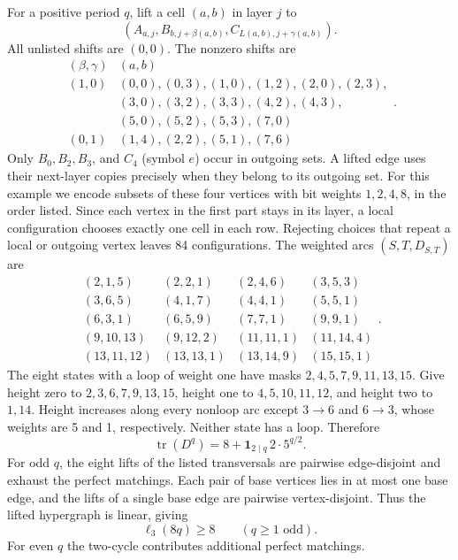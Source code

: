 \documentclass[10pt]{article}
\numberwithin{equation}{section}
\begin{document}
For a positive period $q$, lift a cell $(a,b)$ in layer $j$ to
\[
 (A_{a,j},B_{b,j+\beta(a,b)},C_{L(a,b),j+\gamma(a,b)}).
\]
All unlisted shifts are $(0,0)$. The nonzero shifts are
\[
\begin{array}{c|l}
(\beta,\gamma)&(a,b)\\\hline
(1,0)&(0,0),(0,3),(1,0),(1,2),(2,0),(2,3),\\
     &(3,0),(3,2),(3,3),(4,2),(4,3),\\
     &(5,0),(5,2),(5,3),(7,0)\\
(0,1)&(1,4),(2,2),(5,1),(7,6)
\end{array}.
\]
Only $B_0,B_2,B_3$, and $C_4$ (symbol $e$) occur in outgoing sets. A lifted edge uses their next-layer copies precisely when they belong to its outgoing set. For this example we encode subsets of these four vertices with bit weights $1,2,4,8$, in the order listed. Since each vertex in the first part stays in its layer, a local configuration chooses exactly one cell in each row. Rejecting choices that repeat a local or outgoing vertex leaves 84 configurations. The weighted arcs $(S,T,D_{S,T})$ are
\[
\begin{array}{rrrr}
(2,1,5)&(2,2,1)&(2,4,6)&(3,5,3)\\
(3,6,5)&(4,1,7)&(4,4,1)&(5,5,1)\\
(6,3,1)&(6,5,9)&(7,7,1)&(9,9,1)\\
(9,10,13)&(9,12,2)&(11,11,1)&(11,14,4)\\
(13,11,12)&(13,13,1)&(13,14,9)&(15,15,1)
\end{array}.
\]
The eight states with a loop of weight one have masks $2,4,5,7,9,11,13,15$. Give height zero to $2,3,6,7,9,13,15$, height one to $4,5,10,11,12$, and height two to $1,14$. Height increases along every nonloop arc except $3\to6$ and $6\to3$, whose weights are 5 and 1, respectively. Neither state has a loop. Therefore
\[
 \operatorname{tr}(D^q)=8+\mathbf1_{2\mid q}\,2\cdot5^{q/2}.
\]
For odd $q$, the eight lifts of the listed transversals are pairwise edge-disjoint and exhaust the perfect matchings. Each pair of base vertices lies in at most one base edge, and the lifts of a single base edge are pairwise vertex-disjoint. Thus the lifted hypergraph is linear, giving
\begin{equation}\label{finite:eq:latin-odd}
 \ell_3(8q)\ge8\qquad(q\ge1\text{ odd}).
\end{equation}
For even $q$ the two-cycle contributes additional perfect matchings.
\end{document}

